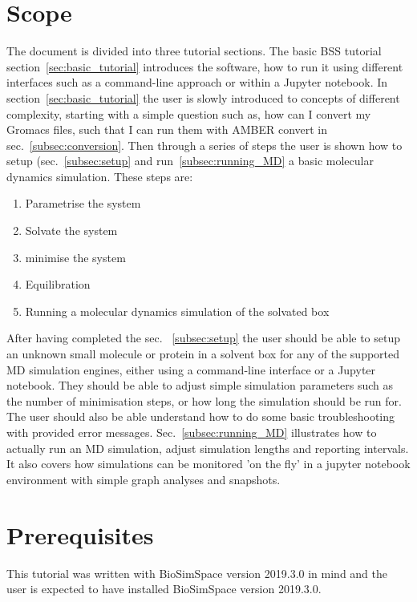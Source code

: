\documentclass[9pt,tutorial]{livecoms}
\begin{document}
\section{Scope}
\label{sec:scope}
The document is divided into three tutorial sections. The basic BSS tutorial section~\ref{sec:basic_tutorial} introduces the software, how to run it using different interfaces such as a command-line approach or within a Jupyter notebook. In section~\ref{sec:basic_tutorial} the user is slowly introduced to concepts of different complexity, starting with a simple question such as, how can I convert my Gromacs files, such that I can run them with AMBER convert in sec.~\ref{subsec:conversion}. Then through a series of steps the user is shown how to setup (sec.~\ref{subsec:setup} and run~\ref{subsec:running_MD} a basic molecular dynamics simulation. These steps are:
\begin{enumerate}
\item Parametrise the system 
\item Solvate the system
\item minimise the system
\item Equilibration
\item Running a molecular dynamics simulation of the solvated box
\end{enumerate}
After having completed the sec. ~\ref{subsec:setup} the user should be able to setup an unknown small molecule or protein in a solvent box for any of the supported MD simulation engines, either using a command-line interface or a Jupyter notebook. They should be able to adjust simple simulation parameters such as the number of minimisation steps, or how long the simulation should be run for. The user should also be able understand how to do some basic troubleshooting with provided error messages. 
Sec.~\ref{subsec:running_MD} illustrates how to actually run an MD simulation, adjust simulation lengths and reporting intervals. It also covers how simulations can be monitored 'on the fly' in a jupyter notebook environment with simple graph analyses and snapshots. 



\section{Prerequisites}
\label{sec:prerequisites}
This tutorial was written with BioSimSpace version 2019.3.0 in mind and the user is expected to have installed BioSimSpace version 2019.3.0. 
\end{document}
